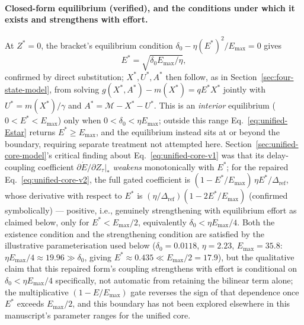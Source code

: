 \documentclass[twocolumn,10pt]{article}
\begin{document}
\paragraph{Closed-form equilibrium (verified), and the conditions under which it exists and strengthens with effort.} At $Z^*=0$, the bracket's equilibrium condition $\delta_0-\eta(E^*)^2/E_{\max}=0$ gives
\begin{equation}
E^* = \sqrt{\delta_0 E_{\max}/\eta},
\label{eq:unified-Estar}
\end{equation}
confirmed by direct substitution; $X^*,U^*,A^*$ then follow, as in Section~\ref{sec:four-state-model}, from solving $g(X^*,A^*)-m(X^*)=qE^*X^*$ jointly with $U^*=m(X^*)/\gamma$ and $A^*=\mathcal M-X^*-U^*$. This is an \emph{interior} equilibrium ($0<E^*<E_{\max}$) only when $0<\delta_0<\eta E_{\max}$; outside this range Eq.~\eqref{eq:unified-Estar} returns $E^*\ge E_{\max}$, and the equilibrium instead sits at or beyond the boundary, requiring separate treatment not attempted here. Section~\ref{sec:unified-core-model}'s critical finding about Eq.~\eqref{eq:unified-core-v1} was that its delay-coupling coefficient $\partial\dot E/\partial Z_\tau|_*$ \emph{weakens} monotonically with $E^*$; for the repaired Eq.~\eqref{eq:unified-core-v2}, the full gated coefficient is $(1-E^*/E_{\max})\,\eta E^*/\Delta_{\text{ref}}$, whose derivative with respect to $E^*$ is $(\eta/\Delta_{\text{ref}})(1-2E^*/E_{\max})$ (confirmed symbolically) --- positive, i.e., genuinely strengthening with equilibrium effort as claimed below, only for $E^*<E_{\max}/2$, equivalently $\delta_0<\eta E_{\max}/4$. Both the existence condition and the strengthening condition are satisfied by the illustrative parameterisation used below ($\delta_0=0.0118$, $\eta=2.23$, $E_{\max}=35.8$: $\eta E_{\max}/4\approx19.96\gg\delta_0$, giving $E^*\approx0.435\ll E_{\max}/2=17.9$), but the qualitative claim that this repaired form's coupling strengthens with effort is conditional on $\delta_0<\eta E_{\max}/4$ specifically, not automatic from retaining the bilinear term alone; the multiplicative $(1-E/E_{\max})$ gate reverses the sign of that dependence once $E^*$ exceeds $E_{\max}/2$, and this boundary has not been explored elsewhere in this manuscript's parameter ranges for the unified core.
\end{document}
